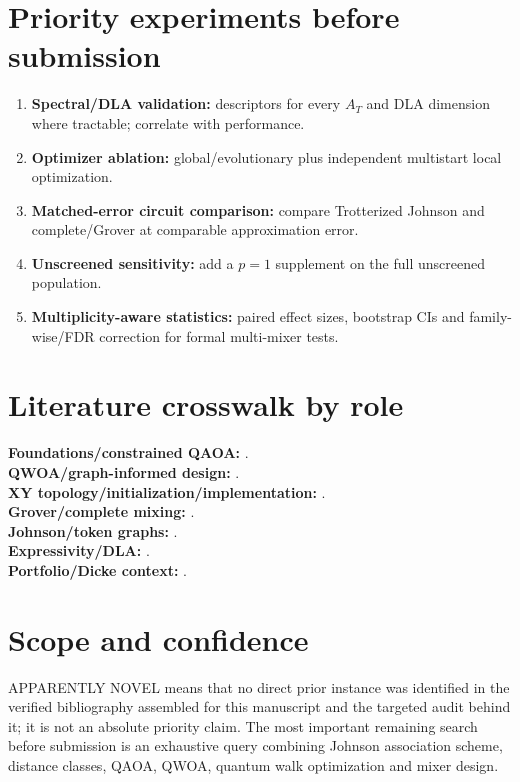 \documentclass[11pt]{article}
\begin{document}
\section{Priority experiments before submission}
\begin{enumerate}
\item \textbf{Spectral/DLA validation:} descriptors for every $A_T$ and DLA dimension where tractable; correlate with performance.
\item \textbf{Optimizer ablation:} global/evolutionary plus independent multistart local optimization.
\item \textbf{Matched-error circuit comparison:} compare Trotterized Johnson and complete/Grover at comparable approximation error.
\item \textbf{Unscreened sensitivity:} add a $p=1$ supplement on the full unscreened population.
\item \textbf{Multiplicity-aware statistics:} paired effect sizes, bootstrap CIs and family-wise/FDR correction for formal multi-mixer tests.
\end{enumerate}

\section{Literature crosswalk by role}
\textbf{Foundations/constrained QAOA:} \cite{Farhi2014,Hadfield2019,Wang2020,Fuchs2022,Fuchs2024}.\\
\textbf{QWOA/graph-informed design:} \cite{Marsh2019,Marsh2020,Slate2021,Matwiejew2024,Qu2024,Bennett2026Nonvariational}.\\
\textbf{XY topology/initialization/implementation:} \cite{Cook2019,He2023,Kordonowy2026,Awasthi2026Trotter,Bucher2026WarmStart}.\\
\textbf{Grover/complete mixing:} \cite{Bartschi2020,Bridi2024,Slate2021,Qu2024}.\\
\textbf{Johnson/token graphs:} \cite{FabilaMonroy2012Token,Carballosa2017Regularity,MinSeoHeo2026}.\\
\textbf{Expressivity/DLA:} \cite{Bridi2026Expressivity,Kordonowy2026}.\\
\textbf{Portfolio/Dicke context:} \cite{Hodson2019,Slate2021,He2023,Qu2024,Scursulim2026}.

\section{Scope and confidence}
APPARENTLY NOVEL means that no direct prior instance was identified in the verified bibliography assembled for this manuscript and the targeted audit behind it; it is not an absolute priority claim. The most important remaining search before submission is an exhaustive query combining Johnson association scheme, distance classes, QAOA, QWOA, quantum walk optimization and mixer design.



\end{document}
